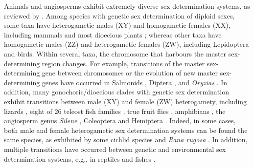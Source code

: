 \documentclass[12pt]{article}
\begin{document}

Animals and angiosperms exhibit extremely diverse sex determination systems, as reviewed by \citet{Bull:1983vi,Charlesworth:2010it,Beukeboom:2014vb,Bachtrog:2014bx}. 
Among species with genetic sex determination of diploid sexes, some taxa have heterogametic males (XY) and homogametic females (XX), including %
mammals and most dioecious plants \citep{Ming:2011iy}; whereas other taxa have homogametic males (ZZ) and heterogametic females (ZW), including Lepidoptera and birds. 
Within several taxa, the chromosome that harbours the master sex-determining region changes. 
For example, transitions of the master sex-determining gene between chromosomes or the evolution of new master sex-determining genes have occurred in Salmonids \citep{Li:2011fm,Yano:2012di}, Diptera \citep{Vicoso:2015hf}, and \textit{Oryzias} \citep{Myosho:2012fv}.
In addition, many gonochoric/dioecious clades with genetic sex determination exhibit transitions between male (XY) and female (ZW) heterogamety, including lizards \citep{Ezaz:2009tk}, eight of 26 teleost fish families \citep{Mank:2006bt}, true fruit flies \citep[Tephritids,][]{Vicoso:2015hf}, amphibians \citep{Hillis:1990gu}, the angiosperm genus \textit{Silene} \citep{Slancarova:2013dq}, Coleoptera and Hemiptera \citep[][plate 2]{Beukeboom:2014vb}.
Indeed, in some cases, both male and female heterogametic sex determination systems can be found the same species, as exhibited by some cichlid species \citep{Ser:2010iq} and \textit{Rana rugosa} \citep{Ogata:2007jm}.
In addition, multiple transitions have occurred between genetic and environmental sex determination systems, e.g., in reptiles and fishes \citep{Conover:1987in,Mank:2006bt,Pokorna:2009ui,Ezaz:2009tk,Pen:2010kk,Holleley:2015hc}.

\end{document}
